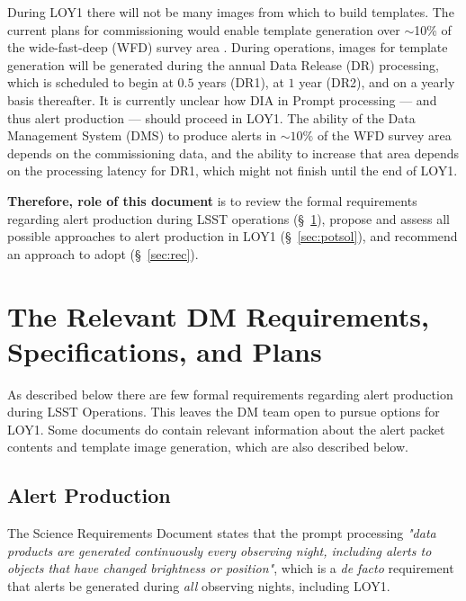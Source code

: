 \documentclass[DM,lsstdraft,toc]{lsstdoc}
\begin{document}
During LOY1 there will not be many images from which to build templates. The current plans for commissioning would enable template generation over $\sim$10\% of the wide-fast-deep (WFD) survey area . During operations, images for template generation will be generated during the annual Data Release (DR) processing, which is scheduled to begin at $0.5$ years (DR1), at $1$ year (DR2), and on a yearly basis thereafter. It is currently unclear how DIA in Prompt processing --- and thus alert production --- should proceed in LOY1. The ability of the Data Management System (DMS) to produce alerts in $\sim10\%$ of the WFD survey area depends on the commissioning data, and the ability to increase that area depends on the processing latency for DR1, which might not finish until the end of LOY1. 

{\bf Therefore, role of this document} is to 
review the formal requirements regarding alert production during LSST operations (\S~\ref{sec:req}),
propose and assess all possible approaches to alert production in LOY1 (\S~\ref{sec:potsol}), and
recommend an approach to adopt (\S~\ref{sec:rec}).

\clearpage
\section{The Relevant DM Requirements, Specifications, and Plans}\label{sec:req}

As described below there are few formal requirements regarding alert production during LSST Operations. This leaves the DM team open to pursue options for LOY1. Some documents do contain relevant information about the alert packet contents and template image generation, which are also described below.

\subsection{Alert Production}\label{ssec:req_ap}

The Science Requirements Document  states that the prompt processing {\it "data products are generated continuously every observing night, including alerts to objects that have changed brightness or position"}, which is a {\it de facto} requirement that alerts be generated during {\it all} observing nights, including LOY1. %
\end{document}
